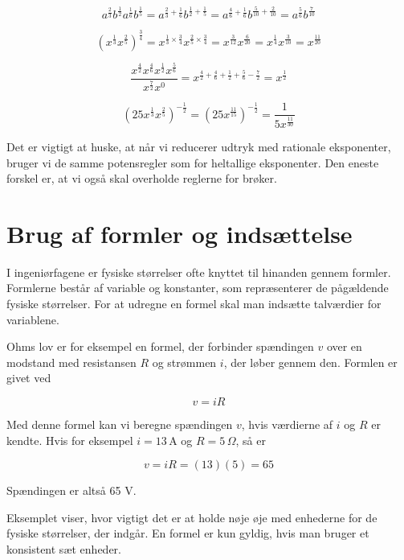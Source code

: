 \begin{example}

\[
a^{\frac{2}{3}}b^{\frac{1}{2}}a^{\frac{1}{6}}b^{\frac{1}{5}} = a^{\frac{2}{3}+\frac{1}{6}}b^{\frac{1}{2}+\frac{1}{5}} = a^{\frac{4}{6}+\frac{1}{6}}b^{\frac{5}{10}+\frac{2}{10}} = a^{\frac{5}{6}}b^{\frac{7}{10}}
\]

\[
\left( x^{\frac{1}{3}} x^{\frac{2}{5}} \right)^{\frac{3}{4}} = x^{\frac{1}{3} \times \frac{3}{4}} x^{\frac{2}{5} \times \frac{3}{4}} = x^{\frac{3}{12}} x^{\frac{6}{20}} = x^{\frac{1}{4}} x^{\frac{3}{10}} = x^{\frac{11}{20}}
\]

\[
\frac{x^{\frac{4}{2}}x^{\frac{4}{6}}x^{\frac{1}{2}}x^{\frac{5}{6}}}{x^{\frac{7}{2}}x^0}
=x^{\frac{4}{2}+\frac{4}{6}+\frac{1}{2}+\frac{5}{6}-\frac{7}{2}}
=x^{\frac{1}{2}}
\]

\[
\left(25x^{\frac{1}{3}}x^{\frac{2}{5}}\right)^{-\frac{1}{2}}
=\left(25x^{\frac{11}{15}}\right)^{-\frac{1}{2}}
=\frac{1}{5x^{\frac{11}{30}}}
\]
\end{example}

Det er vigtigt at huske, at når vi reducerer udtryk med rationale eksponenter, bruger vi de samme potensregler som for heltallige eksponenter. Den eneste forskel er, at vi også skal overholde reglerne for brøker.

\section{Brug af formler og indsættelse}
I ingeniørfagene er fysiske størrelser ofte knyttet til hinanden gennem formler. Formlerne består af variable og konstanter, som repræsenterer de pågældende fysiske størrelser. For at udregne en formel skal man indsætte talværdier for variablene.

Ohms lov er for eksempel en formel, der forbinder spændingen \(v\) over en modstand med resistansen \(R\) og strømmen \(i\), der løber gennem den. Formlen er givet ved

\[
v = iR
\]

Med denne formel kan vi beregne spændingen \(v\), hvis værdierne af \(i\) og \(R\) er kendte. Hvis for eksempel \(i = 13 \, \text{A}\) og \(R = 5 \, \Omega\), så er

\[
v = iR = (13)(5) = 65
\]

Spændingen er altså 65 V.

Eksemplet viser, hvor vigtigt det er at holde nøje øje med enhederne for de fysiske størrelser, der indgår. En formel er kun gyldig, hvis man bruger et konsistent sæt enheder.

